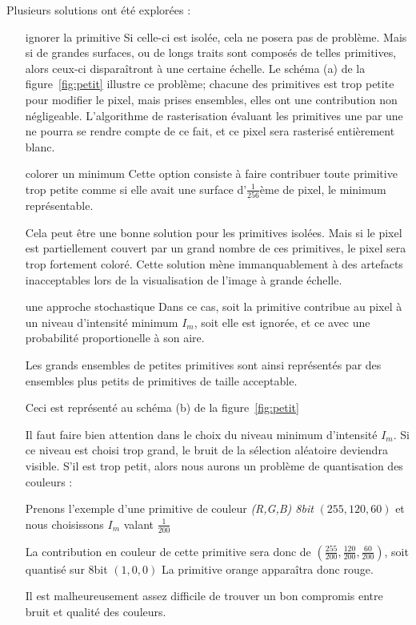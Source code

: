 			Plusieurs solutions ont été
			explorées :
			\begin{enumerate}
				\item[ignorer la primitive] Si celle-ci est isolée, cela ne posera pas de problème. Mais si
				de grandes surfaces, ou de longs traits sont composés de telles primitives, alors ceux-ci
				disparaîtront à une certaine échelle. Le schéma (a) de la figure~\ref{fig:petit} illustre ce problème; chacune des primitives
				est trop petite pour modifier le pixel, mais prises ensembles, elles ont une contribution non
				négligeable. L'algorithme de rasterisation évaluant les primitives une par une ne pourra se
				rendre compte de ce fait, et ce pixel sera rasterisé entièrement blanc.

				\item[colorer un minimum] Cette option consiste à faire contribuer toute primitive trop petite
				comme si elle avait une surface d'$\frac{1}{256}$ème de pixel, le minimum représentable. 

				Cela peut être une bonne solution pour les primitives isolées. Mais si le pixel est partiellement
				couvert par un grand nombre de ces primitives, le pixel sera trop fortement coloré. Cette solution
				mène immanquablement à des artefacts inacceptables lors de la visualisation de l'image à grande échelle. 

				\item[une approche stochastique] Dans ce cas, soit la primitive contribue au pixel à un niveau
				d'intensité minimum $I_m$,  soit elle est ignorée, et ce avec une probabilité proportionelle à son aire. 
				
				Les grands ensembles de petites primitives sont ainsi représentés par des ensembles plus petits de 
				primitives de taille acceptable. 

				Ceci est représenté au schéma (b) de la figure~\ref{fig:petit}

				Il faut faire bien attention dans le choix du niveau minimum d'intensité $I_m$. Si ce niveau est
				choisi trop grand, le bruit de la sélection aléatoire deviendra visible. S'il est trop petit, 
				alors nous aurons un problème de quantisation des couleurs :

				Prenons l'exemple d'une primitive
				de couleur 
				\emph{(R,G,B) 8bit } $(255,120,60)$ et nous choisissons $I_m$ valant $\frac{1}{200}$ 
				
				La contribution en couleur de cette primitive sera donc de $(\frac{255}{200},\frac{120}{200},\frac{60}{200})$, soit
				quantisé sur 8bit $(1,0,0)$ La primitive orange apparaîtra donc rouge. 
				
				Il est malheureusement assez difficile de trouver un bon compromis entre bruit et qualité des couleurs. 
			\end{enumerate}

